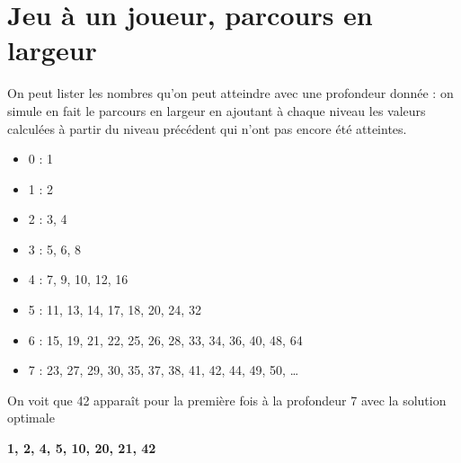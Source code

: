 \section{Jeu à un joueur, parcours en largeur}
\begin{Exercise}
On peut lister les nombres qu'on peut atteindre avec une
profondeur donnée : on simule en fait le parcours en largeur en ajoutant à chaque niveau les valeurs calculées à partir du niveau précédent qui n'ont pas encore été atteintes.
\begin{itemize} 
\item 0 : 1 
\item 1 : 2 
\item 2 : 3, 4 
\item 3 : 5, 6, 8
\item 4 : 7, 9, 10, 12, 16 
\item 5 : 11, 13, 14, 17, 18, 20, 24, 32 
\item 6 : 15, 19, 21, 22, 25, 26, 28, 33, 34, 36, 40, 48, 64 
\item 7 : 23, 27, 29, 30, 35, 37, 38, 41, 42, 44, 49, 50,  \dots 
\end{itemize} 

On voit que 42 apparaît pour la première fois à la profondeur 7 avec la solution optimale 
\begin{center}
    \bf 1, 2, 4, 5, 10, 20, 21, 42
\end{center} 
\end{Exercise}
